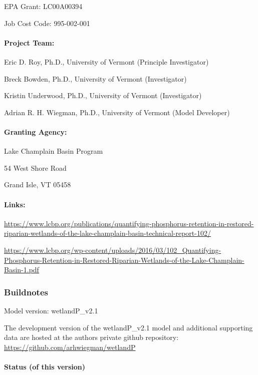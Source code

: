 \documentclass[
]{article}
\begin{document}
EPA Grant: LC00A00394

Job Cost Code: 995-002-001

\hypertarget{project-team}{%
\paragraph{Project Team:}\label{project-team}}

Eric D. Roy, Ph.D., University of Vermont (Principle Investigator)

Breck Bowden, Ph.D., University of Vermont (Investigator)

Kristin Underwood, Ph.D., University of Vermont (Investigator)

Adrian R. H. Wiegman, Ph.D., University of Vermont (Model Developer)

\hypertarget{granting-agency}{%
\paragraph{Granting Agency:}\label{granting-agency}}

Lake Champlain Basin Program

54 West Shore Road

Grand Isle, VT 05458

\hypertarget{links}{%
\paragraph{Links:}\label{links}}

\url{https://www.lcbp.org/publications/quantifying-phosphorus-retention-in-restored-riparian-wetlands-of-the-lake-champlain-basin-technical-report-102/}

\url{https://www.lcbp.org/wp-content/uploads/2016/03/102_Quantifying-Phosphorus-Retention-in-Restored-Riparian-Wetlands-of-the-Lake-Champlain-Basin-1.pdf}

\hypertarget{buildnotes}{%
\subsubsection{Buildnotes}\label{buildnotes}}

Model version: wetlandP\_v2.1

The development version of the wetlandP\_v2.1 model and additional
supporting data are hosted at the authors private github repository:
\url{https://github.com/arhwiegman/wetlandP}

\hypertarget{status-of-this-version}{%
\paragraph{Status (of this version)}\label{status-of-this-version}}
\end{document}
